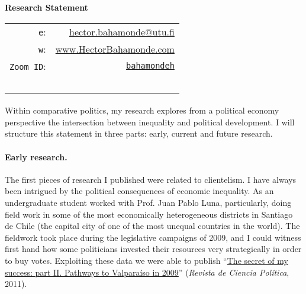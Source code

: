 \documentclass[letterpaper]{article}
\def\name{Research Statement}
\begin{document}
\centerline{\huge \bf \name}

\vspace{0.25in}


 \hspace{\fill}\begin{minipage}{0.35\linewidth}
  \begin{tabular}{rr}
    \texttt{e}: & \href{mailto:hector.bahamonde@utu.fi}{hector.bahamonde@utu.fi} \\
    \texttt{w}: & \href{http://www.hectorbahamonde.com}{www.HectorBahamonde.com}\\
    \texttt{Zoom ID}: & \href{https://utu.zoom.us/my/bahamondeh}{\texttt{bahamondeh}}\\
    \\
    \\
    \\
    \\
    \\
  \end{tabular}
\end{minipage}





\paragraph{}Within comparative politics, my research explores from a political economy perspective the intersection between inequality and political development. I will structure this statement in three parts: early, current and future research.

\paragraph{Early research.} The first pieces of research I published were related to clientelism. I have always been intrigued by the political consequences of economic inequality. As an undergraduate student worked with Prof. Juan Pablo Luna, particularly, doing field work in some of the most economically heterogeneous districts in Santiago de Chile (the capital city of one of the most unequal countries in the world). The fieldwork took place during the legislative campaigns of 2009, and I could witness first hand how some politicians invested their resources very strategically in order to buy votes. Exploiting these data we were able to publish ``\href{https://scielo.conicyt.cl/pdf/revcipol/v31n2/art07.pdf}{The secret of my success: part II. Pathways to Valpara\'iso in 2009}'' (\emph{Revista de Ciencia Pol\'itica}, 2011). 
\end{document}
